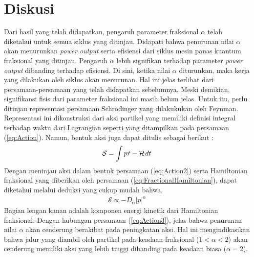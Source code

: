 \section{Diskusi}
Dari hasil yang telah didapatkan, pengaruh parameter fraksional \(\alpha\) telah diketahui untuk semua siklus yang ditinjau. Didapati bahwa penurunan nilai \(\alpha\) akan menurunkan \textit{power output} serta efisiensi dari siklus mesin panas kuantum fraksional yang ditinjau. Pengaruh \(\alpha\) lebih signifikan terhadap parameter \textit{power output} dibanding terhadap efisiensi. Di sini, ketika nilai \(\alpha\) diturunkan, maka kerja yang dilakukan oleh siklus akan menurunan. Hal ini jelas terlihat dari persamaan-persamaan yang telah didapatkan sebelumnya. Meski demikian, signifikansi fisis dari parameter fraksional ini masih belum jelas. Untuk itu, perlu ditinjau representasi persamaan Schrodinger yang dilakukukan oleh Feynman. Representasi ini dikonstruksi dari aksi partikel yang memiliki definisi integral terhadap waktu dari Lagrangian seperti yang ditampilkan pada persamaan (\ref{eq:Action}). Namun, bentuk aksi juga dapat ditulis sebagai berikut \cite{Hilfer2000Applications}:
\begin{align}
    \mathcal{S} = \int p \dot{r} - \mathcal{H} \hspace{1px} dt \label{eq:Action2}
\end{align}
Dengan meninjau aksi dalam bentuk persamaan (\ref{eq:Action2}) serta Hamiltonian fraksional yang diberikan oleh persamaan (\ref{eq:FractionalHamiltonian}), dapat diketahui melalui deduksi yang cukup mudah bahwa,
\begin{align}
    \mathcal{S} \propto -D_\alpha |p|^\alpha \label{eq:Action3}
\end{align}
Bagian lengan kanan adalah komponen energi kinetik dari Hamiltonian fraksional. Dengan hubungan persamaan (\ref{eq:Action3}), jelas bahwa penurunan nilai \(\alpha\) akan cenderung berakibat pada peningkatan aksi. Hal ini mengindikasikan bahwa jalur yang diambil oleh partikel pada keadaan fraksional (\(1<\alpha<2\)) akan cenderung memiliki aksi yang lebih tinggi dibanding pada keadaan biasa (\(\alpha=2\)).
